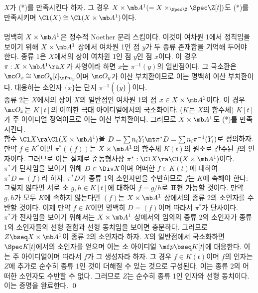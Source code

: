 	
	\begin{proposition}
	$X$가 (*)를 만족시킨다 하자. 그 경우 $X\times\mb A^1(=X\times_{\Spec\Z}\Spec\Z[t])$도 (*)를 만족시키며
	$\Cl(X)\cong\Cl(X\times\mb A^1)$이다.\\\\
	\pf 명백히 $X\times\mb A^1$은 정수적 Noether 분리 스킴이다.
	이것이 여차원 1에서 정칙임을 보이기 위해 $X\times\mb A^1$ 상에서 여차원 1인 점 $y$가 두 종류 존재함을 기억해 두어야 한다.
	종류 1은 $X$에서의 상이 여차원 1인 점 $y$인 점 $x$이다.
	이 경우 $\pi:X\times\mb A^1\ra X$가 사영이라 하면 $x$는 $\pi^{-1}(y)$의 일반점이다.
	그 국소환은 $\mc O_x\cong\mc O_y[t]_{\mf m_y}$이며 $\mc O_y$가 이산 부치환이므로 이는 명백히 이산 부치환이다.
	대응하는 소인자 $\overline{\{x\}}$는 단지 $\pi^{-1}(\overline{\{y\}})$이다.\\
	종류 2는 $X$에서의 상이 $X$의 일반점인 여차원 1의 점 $x\in X\times\mb A^1$이다.
	이 경우 $\mc O_x$는 $K[t]$의 어떠한 극대 아이디얼에서의 국소화이다. ($K$는 $X$의 함수체)
	$K[t]$가 주 아이디얼 정역이므로 이는 이산 부치환이다.
	그러므로 $X\times\mb A^1$도 (*)를 만족시킨다.\\
	함수 $\Cl X\ra\Cl(X\times\mb A^1)$을 $D=\sum n_iY_i\mt\pi^*D=\sum n_i\pi^{-1}(Y_i)$로 정의하자.
	만약 $f\in K^*$이면 $\pi^*((f))$는 $X\times\mb A^1$의 함수체 $K(t)$의 원소로 간주된 $f$의 인자이다.
	그러므로 이는 실제로 준동형사상 $\pi^*:\Cl X\ra\Cl(X\times\mb A^1)$이다.\\
	$\pi^*$가 단사임을 보이기 위해 $D\in\Div X$이며 어떠한 $f\in K(t)$에 대하여 $\pi^*D=(f)$라 하자.
	$\pi^*D$가 종류 1의 소인자만을 수반하므로 $f$는 $K$에 속해야 한다:
	그렇지 않다면 서로 소 $g,h\in K[t]$에 대하여 $f=g/h$로 표현 가능할 것이다.
	만약 $g,h$가 모두 $K$에 속하지 않는다면 $(f)$는 $X\times\mb A^1$ 상에서의 종류 2의 소인자를 수반할 것이다.
	이제 만약 $f\in K$이면 명백히 $D=(f)$이며 따라서 $\pi^*$가 단사이다.\\
	$\pi^*$가 전사임을 보이기 위해서는 $X\times\mb A^1$ 상에서의 임의의 종류 2의 소인자가
	종류 1의 소인자들의 선형 결합과 선형 동치임을 보이면 충분하다.
	그러므로 $Z\bseq X\times\mb A^1$이 종류 2의 소인자라 하자.
	$X$의 일반점에서 국소화하면 $\Spec K[t]$에서의 소인자를 얻으며 이는 소 아이디얼 $\mf p\bseq K[t]$에 대응한다.
	이는 주 아이디얼이며 따라서 $f$가 그 생성자라 하자.
	그 경우 $f\in K(t)$이며 $f$의 인자는 $Z$에 추가로 순수히 종류 1인 것이 더해질 수 있는 것으로 구성된다.
	이는 종류 2의 어떠한 소인자도 수반할 수 없다. 그러므로 $Z$는 순수히 종류 1인 인자와 선형 동치이다. 이는 증명을 완료한다.
	\qed
	\end{proposition}
	
